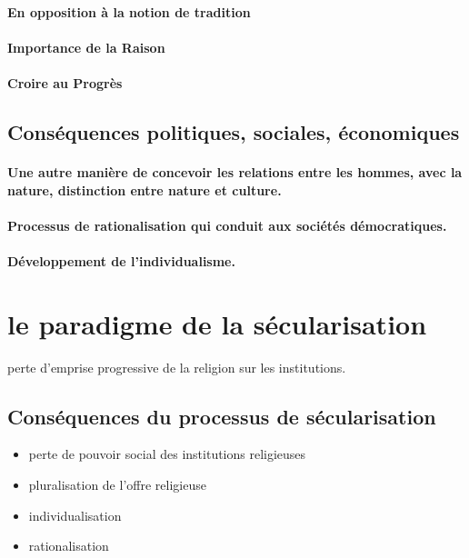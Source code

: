 \paragraph{En opposition à la notion de tradition}
\paragraph{Importance de la Raison} 
\paragraph{Croire au Progrès} 

\subsection{Conséquences politiques, sociales, économiques}

\paragraph{Une autre manière de concevoir les relations entre les hommes, avec la nature, distinction entre
nature et culture.} 
\paragraph{Processus de rationalisation qui conduit aux sociétés démocratiques.} 
\paragraph{Développement de l’individualisme.} 

\section{le paradigme de la sécularisation}
 \begin{Def}[Sécularisation] perte d’emprise progressive de la religion sur les institutions.
\end{Def}
 

\subsection{Conséquences du processus de sécularisation}
\begin{itemize}
    \item  perte de pouvoir social des institutions religieuses
   \item  pluralisation de l’offre religieuse
   \item  individualisation
   \item  rationalisation
\end{itemize}


